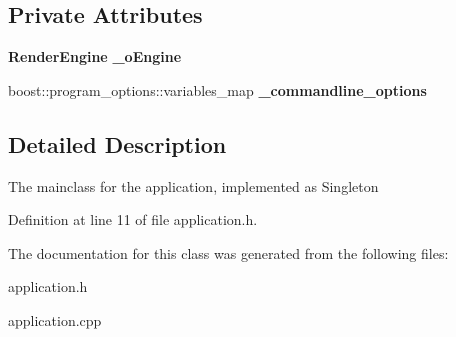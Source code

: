 \subsection*{Private Attributes}
\begin{DoxyCompactItemize}
\item 
{\bf Render\-Engine} {\bfseries \-\_\-o\-Engine}\label{classSoundfieldViewer_1_1Application_ac8508c607390eb0d79221cedc71fc626}

\item 
boost\-::program\-\_\-options\-::variables\-\_\-map {\bfseries \-\_\-commandline\-\_\-options}\label{classSoundfieldViewer_1_1Application_a74b293cdb1cdc4c4e844dbff99595a92}

\end{DoxyCompactItemize}


\subsection{Detailed Description}
The mainclass for the application, implemented as Singleton 

Definition at line 11 of file application.\-h.



The documentation for this class was generated from the following files\-:\begin{DoxyCompactItemize}
\item 
application.\-h\item 
application.\-cpp\end{DoxyCompactItemize}
